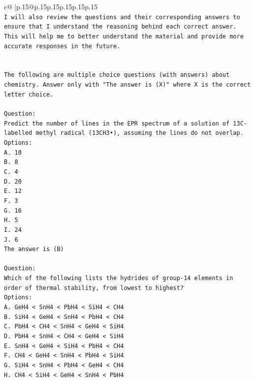 \documentclass{article}
\begin{document}
{\begin{supertabular}{c@{$\;$}|p{.15\linewidth}@{}p{.15\linewidth}p{.15\linewidth}p{.15\linewidth}p{.15\linewidth}p{.15\linewidth}}
{{{\\ 
\texttt{I will also review the questions and their corresponding answers to ensure that I understand the reasoning behind each correct answer. This will help me to better understand the material and provide more accurate responses in the future.} \\
\\ 
\\ 
\texttt{The following are multiple choice questions (with answers) about chemistry. Answer only with "The answer is (X)" where X is the correct letter choice.} \\
\\ 
\texttt{Question:} \\
\texttt{Predict the number of lines in the EPR spectrum of a solution of 13C{-}labelled methyl radical (13CH3•), assuming the lines do not overlap.} \\
\texttt{Options:} \\
\texttt{A. 10} \\
\texttt{B. 8} \\
\texttt{C. 4} \\
\texttt{D. 20} \\
\texttt{E. 12} \\
\texttt{F. 3} \\
\texttt{G. 16} \\
\texttt{H. 5} \\
\texttt{I. 24} \\
\texttt{J. 6} \\
\texttt{The answer is (B)} \\
\\ 
\texttt{Question:} \\
\texttt{Which of the following lists the hydrides of group{-}14 elements in order of thermal stability, from lowest to highest?} \\
\texttt{Options:} \\
\texttt{A. GeH4 < SnH4 < PbH4 < SiH4 < CH4} \\
\texttt{B. SiH4 < GeH4 < SnH4 < PbH4 < CH4} \\
\texttt{C. PbH4 < CH4 < SnH4 < GeH4 < SiH4} \\
\texttt{D. PbH4 < SnH4 < CH4 < GeH4 < SiH4} \\
\texttt{E. SnH4 < GeH4 < SiH4 < PbH4 < CH4} \\
\texttt{F. CH4 < GeH4 < SnH4 < PbH4 < SiH4} \\
\texttt{G. SiH4 < SnH4 < PbH4 < GeH4 < CH4} \\
\texttt{H. CH4 < SiH4 < GeH4 < SnH4 < PbH4} \\
}}}
\end{supertabular}}
\end{document}
